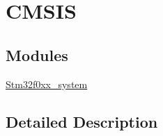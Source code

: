 \hypertarget{group___c_m_s_i_s}{}\section{C\+M\+S\+IS}
\label{group___c_m_s_i_s}
\subsection*{Modules}
\begin{DoxyCompactItemize}
\item 
\hyperlink{group__stm32f0xx__system}{Stm32f0xx\+\_\+system}
\end{DoxyCompactItemize}


\subsection{Detailed Description}
